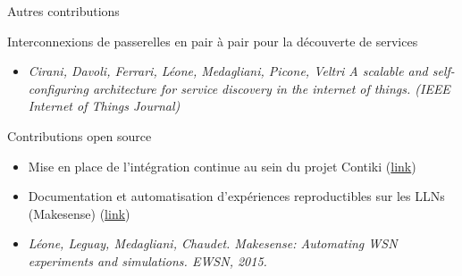 \begin{frame}{Autres contributions}
  
  \begin{block}{Interconnexions de passerelles en pair à pair pour la découverte de services}
    \begin{itemize}
      \item \textit{{Cirani, Davoli, Ferrari, L{\'e}one, Medagliani, Picone, Veltri} A scalable and self-configuring architecture for service discovery in
        the internet of things. (IEEE Internet of Things Journal)}
    \end{itemize}
  \end{block}

  \begin{block}{Contributions open source}
    \begin{itemize}
      \item Mise en place de l'intégration continue au sein du projet Contiki (\href{https://contiki-os.blogspot.fr/2012/12/contiki-regression-tests-9-hardware.html}{link})
      \item Documentation et automatisation d'expériences reproductibles sur les LLNs (Makesense) (\href{https://github.com/sieben/makesense}{link})
      \item \textit{L{\'e}one, Leguay, Medagliani, Chaudet. Makesense: Automating WSN experiments and simulations.
              EWSN, 2015.}
    \end{itemize}
  \end{block}




\end{frame}



